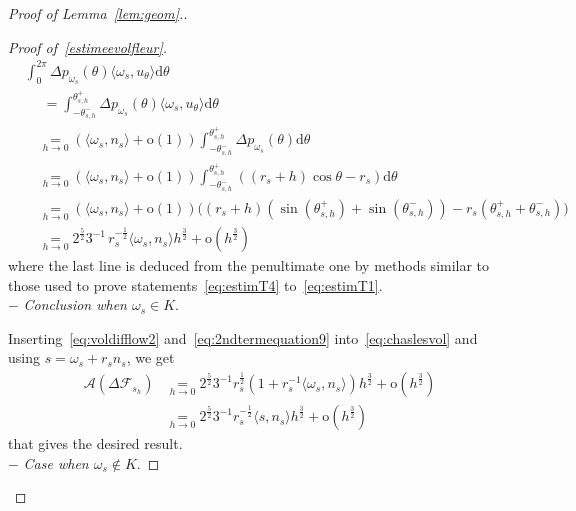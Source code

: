 \documentclass[10pt]{amsart}
\theoremstyle{definition}\newtheorem{defi}[theo]{Definition}\newtheorem{rema}[theo]{Remark}\newtheorem{exam}[theo]{Example}\newtheorem{exem}[theo]{Example}\newtheorem{nota}[theo]{Notation}
\newcommand{\cA}{\mathcal{A}}
\newcommand{\cF}{\mathcal{F}}
\newcommand{\dd}{\mathrm{d}}
\newcommand{\od}{\mathrm{o}}
\newcommand{\pass}{\vspace{0.3cm}\noindent}
\newcommand{\noi}{\noindent}
\newenvironment*{prooff}{\begin{proof}}{\let\qed\relax\end{proof}}
\begin{document}
\begin{proof}[{Proof of Lemma~\ref{lem:geom}.}]
\begin{prooff}[{Proof of~\eqref{estimeevolfleur}}]
\begin{align}
&\int_0^{2\pi} \Delta p_{\omega_s}(\theta)\langle \omega_s, u_{\theta}\rangle\dd\theta\nonumber\\
& \quad\; = \int_{-\theta_{s,h}^-}^{\theta_{s,h}^+} \Delta p_{\omega_s}(\theta)\langle \omega_s, u_{\theta}\rangle\dd\theta\nonumber\\
& \quad\underset{h\to 0}{=} (\langle \omega_s, n_s\rangle+\od(1))\int_{-\theta_{s,h}^-}^{\theta_{s,h}^+} \Delta p_{\omega_s}(\theta)\dd\theta\nonumber\\
&\quad \underset{h\to 0}{=} (\langle \omega_s, n_s\rangle+\od(1))\int_{-\theta_{s,h}^-}^{\theta_{s,h}^+} ((r_s+h)\cos\theta-r_s)\dd\theta\nonumber\\
&\quad \underset{h\to 0}{=} (\langle \omega_s, n_s\rangle +\od(1))\big((r_s+h)\left(\sin\left(\theta_{s,h}^+\right)+\sin\left(\theta_{s,h}^-\right)\right)-r_s\left(\theta_{s,h}^++\theta_{s,h}^-\right)\big)\nonumber\\
& \quad \underset{h\to 0}{=} 2^{\frac{5}{2}}3^{-1}\, r_s^{-\frac1{2}} \langle \omega_s, n_s\rangle h^{\frac{3}{2}}+ \od\left(h^{\frac32}\right)\label{eq:2ndtermequation9}
\end{align}
where the last line is deduced from the penultimate one by methods similar to those used to prove statements~\eqref{eq:estimT4} to~\eqref{eq:estimT1}.\\

 $-$ \emph{Conclusion when $\omega_s\in K$}.

Inserting~\eqref{eq:voldifflow2} and~\eqref{eq:2ndtermequation9} into~\eqref{eq:chaslesvol} and using $s=\omega_s+r_s n_s$, we get
\begin{align*}
\cA(\Delta\cF_{s_h}) & \underset{h\to 0}{=} 2^{\frac{5}{2}}3^{-1} r_s^{\frac1{2}}\left(1+r_s^{-1}\langle \omega_s, n_s\rangle\right)h^{\frac{3}{2}} + \od\left(h^{\frac32}\right)\\
& \underset{h\to 0}{=} 2^{\frac{5}{2}}3^{-1} r_s^{-\frac1{2}}\langle s,n_s\rangle h^{\frac{3}{2}} + \od\left(h^{\frac32}\right)
\end{align*}
that gives the desired result.\\

$-$ \emph{Case when $\omega_s\not\in K$}.


\end{prooff}
\end{proof}
\end{document}
